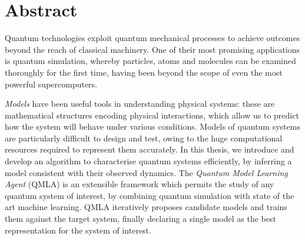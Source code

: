 \chapter*{Abstract}



Quantum technologies exploit quantum mechanical processes to achieve outcomes beyond the reach of classical machinery.
One of their most promising applications is quantum simulation, 
    whereby particles, atoms and molecules can be examined thoroughly for the first time, 
    having been beyond the scope of even the most powerful supercomputers. 
\par 
\emph{Models} have been useful tools in understanding physical systems:
    these are mathematical structures encoding physical interactions,
    which allow us to predict how the system will behave under various conditions. 
Models of quantum systems are particularly difficult to design and test, 
    owing to the huge computational resources required to represent them accurately.
In this thesis, we introduce and develop an algorithm to characterise quantum systems efficiently, 
    by inferring a model consistent with their observed dynamics.
The \emph{Quantum Model Learning Agent} (QMLA) is an extensible framework which permits 
    the study of any quantum system of interest, 
    by combining quantum simulation with state of the art machine learning.
QMLA iteratively proposes candidate models and trains them against the target system,
    finally declaring a single model as the best representation for the system of interest.  
\par 

